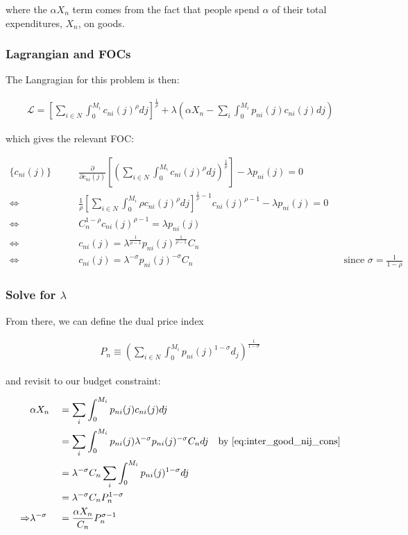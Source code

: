 \documentclass[10pt]{article}
\begin{document}
where the $\alpha X_n$ term comes from the fact that 
people spend $\alpha$ of their total expenditures, $X_n$,
on goods.

\subsubsection{Lagrangian and FOCs}

The Langragian for this problem is then:

\begin{align}
    \mathcal{L} = \left[\sum_{i \in N} \int_0^{M_i} c_{n i}(j)^\rho d j\right]^{\frac{1}{\rho}} + \lambda \left(\alpha X_n - \sum_i \int_{0}^{M_i} p_{n i}(j) c_{n i}(j) d j\right)
\end{align}

which gives the relevant FOC:

\begin{align}
    \{c_{n i}(j)\} \quad \quad &\frac{\partial}{\partial c_{n i}(j)} \left[\left(\sum_{i \in N} \int_0^{M_i} c_{n i}(j)^\rho d j\right)^{\frac{1}{\rho}}\right] - \lambda p_{n i}(j) = 0 \\
    \Leftrightarrow & \frac{1}{\rho} \left[\sum_{i \in N} \int_0^{M_i} \rho c_{n i}(j)^\rho d j\right]^{\frac{1}{\rho}-1} c_{n i}(j)^{\rho-1} - \lambda p_{n i}(j) = 0 \\
    \Leftrightarrow & C_n^{1-\rho} c_{n i}(j)^{\rho-1} = \lambda p_{n i}(j) \\
    \Leftrightarrow & c_{n i}(j) = \lambda^{\frac{1}{\rho -1}} p_{ni}(j)^{\frac{1}{\rho -1}} C_n \\ 
    \Leftrightarrow & c_{n i}(j) = \lambda^{-\sigma} p_{ni}(j)^{-\sigma} C_n && \text{since $\sigma = \frac{1}{1-\rho}$} \label{eq:inter_good_nij_cons}
\end{align}


\subsubsection{Solve for $\lambda$}

From there, we can define the dual price index 

\begin{align}
    P_n \equiv \left(\sum_{i \in N} \int_0^{M_i} p_{n i}(j)^{1-\sigma} d_j \right)^{\frac{1}{1-\sigma}} \label{eq:price_index_p_n}
\end{align}

and revisit to our budget constraint:

\begin{alignat}{2}
    &\alpha X_n && = \sum_i \int_{0}^{M_i} p_{n i}(j) c_{n i}(j) d j \\
    &&&= \sum_i \int_{0}^{M_i} p_{n i}(j) \lambda^{-\sigma} p_{ni}(j)^{-\sigma} C_n d j \quad \text{by \eqref{eq:inter_good_nij_cons}} \\
    &&&= \lambda^{-\sigma} C_n \sum_i \int_{0}^{M_i} p_{n i}(j)^{1-\sigma} d j \\
    &&& = \lambda^{-\sigma} C_n P_n^{1-\sigma} \\
    \Rightarrow &\lambda^{-\sigma} &&= \frac{\alpha X_n}{C_n} P_n^{\sigma-1} \\
\end{alignat}
\end{document}
